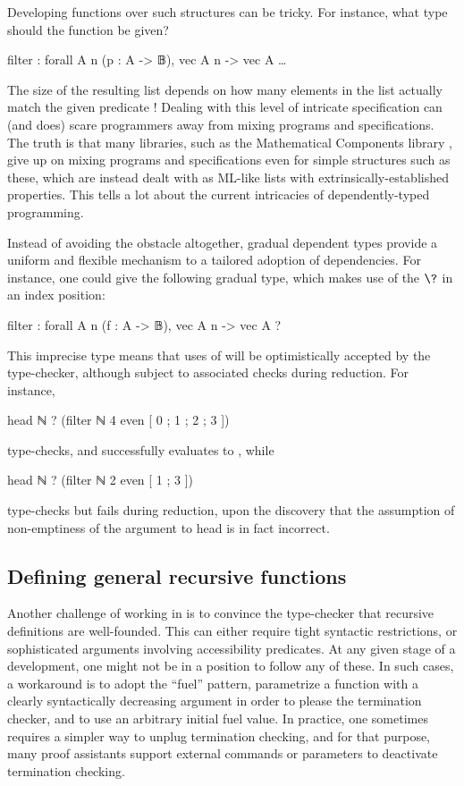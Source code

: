 Developing functions over such structures can be tricky. For instance, what type should the  function be given?
\begin{coqcode}
  filter : forall A n (p : A -> 𝔹), vec A n -> vec A …
\end{coqcode}
The size of the resulting list depends on how many elements in the list actually match the given predicate !
Dealing with this level of intricate specification can (and does) scare programmers away from mixing programs and specifications. The truth is that many libraries, such as the Mathematical
Components library ,
give up on mixing programs and specifications even for simple structures such as these, which are instead dealt with as ML-like lists with extrinsically-established properties. This
tells a lot about the current intricacies of dependently-typed programming.
  
Instead of avoiding the obstacle altogether, gradual dependent types provide a uniform and flexible mechanism to a tailored adoption of dependencies. For instance, one could give  the following gradual type, which makes use of the  $\?$
in an index position:
\begin{coqcode}
  filter : forall A n (f : A -> 𝔹), vec A n -> vec A ?
\end{coqcode}
This imprecise type means that uses of  will be optimistically accepted by the type-checker, although subject to associated checks during reduction. For instance,
\begin{coqcode}
head ℕ ? (filter ℕ 4 even [ 0 ; 1 ; 2 ; 3 ])
\end{coqcode}
type-checks, and successfully evaluates to , while
\begin{coqcode}
head ℕ ? (filter ℕ 2 even [ 1 ; 3 ])
\end{coqcode}
type-checks but fails during reduction, upon the discovery that the assumption
of non-emptiness of the argument to head is in fact incorrect.

\subsection{Defining general recursive functions}
\label{sec:rec}

Another challenge of working in  is to convince the type-checker that recursive
definitions are well-founded.
This can either require tight syntactic restrictions, or sophisticated arguments involving
accessibility predicates. At any given stage of a development,
one might not be in a position to follow any of these.
In such cases, a workaround is to adopt the “fuel” pattern, \ie parametrize a function with
a clearly syntactically decreasing argument in order to please the termination checker,
and to use an arbitrary initial fuel value.
In practice, one sometimes requires a simpler way to unplug termination checking,
and for that purpose, many proof assistants support external commands or parameters to deactivate termination checking.%
%

